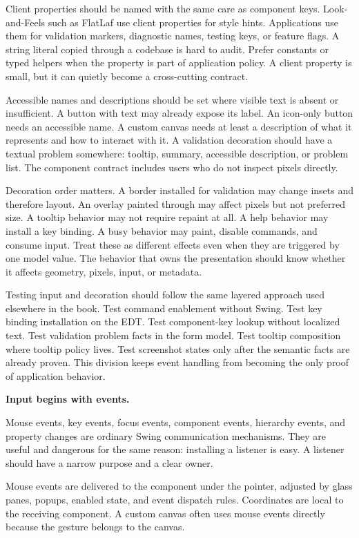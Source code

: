 Client properties should be named with the same care as component keys. Look-and-Feels such as FlatLaf use client properties for style hints. Applications use them for validation markers, diagnostic names, testing keys, or feature flags. A string literal copied through a codebase is hard to audit. Prefer constants or typed helpers when the property is part of application policy. A client property is small, but it can quietly become a cross-cutting contract.

Accessible names and descriptions should be set where visible text is absent or insufficient. A button with text may already expose its label. An icon-only button needs an accessible name. A custom canvas needs at least a description of what it represents and how to interact with it. A validation decoration should have a textual problem somewhere: tooltip, summary, accessible description, or problem list. The component contract includes users who do not inspect pixels directly.

Decoration order matters. A border installed for validation may change insets and therefore layout. An overlay painted through  may affect pixels but not preferred size. A tooltip behavior may not require repaint at all. A help behavior may install a key binding. A busy behavior may paint, disable commands, and consume input. Treat these as different effects even when they are triggered by one model value. The behavior that owns the presentation should know whether it affects geometry, pixels, input, or metadata.

Testing input and decoration should follow the same layered approach used elsewhere in the book. Test command enablement without Swing. Test key binding installation on the EDT. Test component-key lookup without localized text. Test validation problem facts in the form model. Test tooltip composition where tooltip policy lives. Test screenshot states only after the semantic facts are already proven. This division keeps event handling from becoming the only proof of application behavior.

\textbf{Input begins with events.}

Mouse events, key events, focus events, component events, hierarchy events, and property changes are ordinary Swing communication mechanisms. They are useful and dangerous for the same reason: installing a listener is easy. A listener should have a narrow purpose and a clear owner.

Mouse events are delivered to the component under the pointer, adjusted by glass panes, popups, enabled state, and event dispatch rules. Coordinates are local to the receiving component. A custom canvas often uses mouse events directly because the gesture belongs to the canvas.

